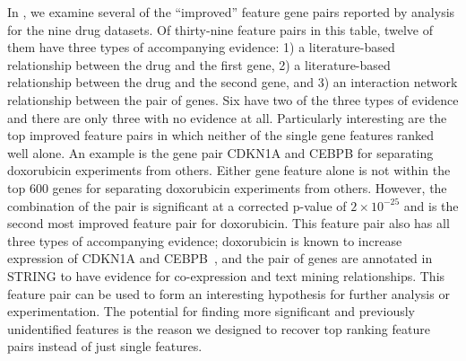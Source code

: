 In \fpstbl, we examine several of the ``improved'' feature gene pairs reported by \genviz analysis for the \lincs nine drug datasets. Of thirty-nine feature pairs in this table, twelve of them have three types of accompanying evidence: 1) a literature-based relationship between the drug and the first gene, 2) a literature-based relationship between the drug and the second gene, and 3) an interaction network relationship between the pair of genes. Six have two of the three types of evidence and there are only three with no evidence at all. Particularly interesting are the top improved feature pairs in which neither of the single gene features ranked well alone. An example is the gene pair CDKN1A and CEBPB for separating doxorubicin experiments from others. Either gene feature alone is not within the top 600 genes for separating doxorubicin experiments from others. However, the combination of the pair is significant at a corrected p-value of $2\times10^{-25}$ and is the second most improved feature pair for doxorubicin. This feature pair also has all three types of accompanying evidence; doxorubicin is known to increase expression of CDKN1A and CEBPB~\cite{zhao2015gene}, and the pair of genes are annotated in STRING to have evidence for co-expression and text mining relationships. This feature pair can be used to form an interesting hypothesis for further analysis or experimentation. The potential for finding more significant and previously unidentified features is the reason we designed \genviz to recover top ranking feature pairs instead of just single features.




